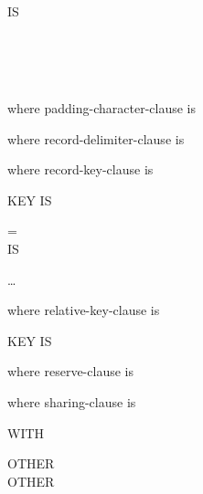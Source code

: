 \begin{0-1}
  \begin{1=}
     \\
  \end{1=}
  IS
\end{0-1}
\begin{1=}
   \\
   \\
    \\
\end{1=}

where padding-character-clause is


where record-delimiter-clause is


where record-key-clause is

 KEY IS \identifier
\begin{0-1}
  \begin{1=}
    = \\
     IS
  \end{1=}
  \begin{1=}
    \identifier
  \end{1=}\ldots
\end{0-1}

where relative-key-clause is

 KEY IS \identifier

where reserve-clause is


where sharing-clause is

 WITH
\begin{1=}
   OTHER \\
   OTHER \\
   
\end{1=}

